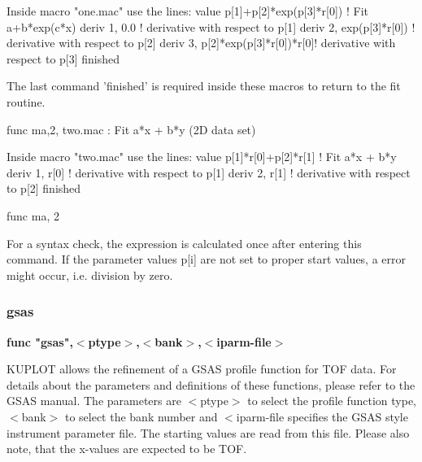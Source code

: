 Inside macro "one.mac" use the lines: 
value p[1]+p[2]*exp(p[3]*r[0])   ! Fit a+b*exp(c*x) 
deriv 1, 0.0                     ! derivative with respect to p[1] 
deriv 2, exp(p[3]*r[0])          ! derivative with respect to p[2] 
deriv 3, p[2]*exp(p[3]*r[0])*r[0]! derivative with respect to p[3] 
finished 
\par
The last command 'finished' is required inside these macros to 
return to the fit routine. 
\par
\begin{MacVerbatim}
func ma,2, two.mac                   : Fit a*x + b*y (2D data set)
\end{MacVerbatim}
Inside macro "two.mac" use the lines: 
value p[1]*r[0]+p[2]*r[1]        ! Fit a*x + b*y 
deriv 1, r[0]                    ! derivative with respect to p[1] 
deriv 2, r[1]                    ! derivative with respect to p[2] 
finished 
\par
\begin{MacVerbatim}
func ma, 2
\end{MacVerbatim}
For a syntax check, the expression is calculated once after entering 
this command. If the parameter values p[i] are not set to proper 
start values, a error might occur, i.e. division by zero. 
\subsubsection{gsas}
{\bf func "gsas",$ <$ptype$> $,$ <$bank$> $,$ <$iparm-file$> $ \par }
\par
\vspace{3pt}
KUPLOT allows the refinement of a GSAS profile function for TOF 
data. For details about the parameters and definitions of these 
functions, please refer to the GSAS manual. The parameters are 
$ <$ptype$> $ to select the profile function type, $ <$bank$> $ to select 
the bank number and $ <$iparm-file specifies the GSAS style 
instrument parameter file. The starting values are read from this 
file. Please also note, that the x-values are expected to be TOF. 
